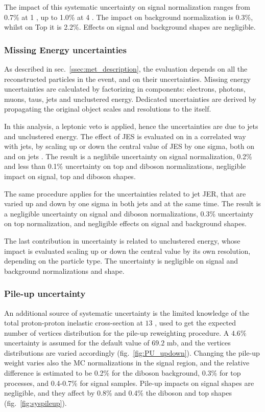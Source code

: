 \noindent The impact of this systematic uncertainty on signal normalization ranges from 0.7\% at 1 \TeV, up to 1.0\% at 4 \TeV. The impact on \VV background normalization is 0.3\%, whilst on Top it is 2.2\%. Effects on signal and background shapes are negligible.

\subsubsection{Missing Energy uncertainties}
\label{metuncsec}
As described in sec.~\ref{ssec:met_description}, the \MET evaluation depends on all the reconstructed particles in the event, and on their uncertainties. Missing energy uncertainties are calculated by factorizing \met in components: electrons, photons, muons, taus, jets and unclustered energy. Dedicated uncertainties are derived by propagating the original object scales and resolutions to the \MET itself.

\noindent In this analysis, a leptonic veto is applied, hence the \MET uncertainties are due to jets and unclustered energy. The effect of JES is evaluated on \MET in a correlated way with jets, by scaling up or down the central value of JES by one sigma, both on \MET and on jets \pt. The result is a neglibile uncertainty on signal normalization, 0.2\% and less than 0.1\% uncertainty on top and diboson normalizations, negligible impact on signal, top and diboson shapes.

\noindent The same procedure applies for the uncertainties related to jet JER, that are varied up and down by one sigma in both jets and \met at the same time. The result is a negligible uncertainty on signal and diboson normalizations, 0.3\% uncertainty on top normalization, and negligible effects on signal and background shapes.

\noindent The last contribution in \MET uncertainty is related to unclustered energy, whose impact is evaluated scaling up or down the central value by its own resolution, depending on the particle type. The uncertainty is negligible on signal and background normalizations and shape.

\subsubsection{Pile-up uncertainty}
An additional source of systematic uncertainty is the limited knowledge of the total proton-proton inelastic cross-section at $13$ \TeV, used to get the expected number of vertices distribution for the pile-up reweighting procedure. A $4.6\%$ uncertainty is assumed for the default value of $69.2$ mb, and the vertices distributions are varied accordingly (fig.~\ref{fig:PU_updown}). Changing the pile-up weight varies also the MC normalizations in the signal region, and the relative difference is estimated to be 0.2\% for the diboson background, 0.3\% for top processes, and 0.4-0.7\% for signal samples. Pile-up impacts on signal shapes are negligible, and they affect by 0.8\% and 0.4\% the diboson and top shapes (fig.~\ref{fig:syspileup}). %

